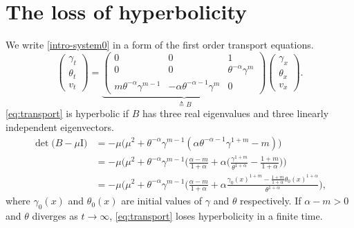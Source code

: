 \documentclass[a4paper,11pt]{article}
\theoremstyle{remark}
\begin{document}
\section{The loss of hyperbolicity} \label{append:hadamard}
We write \eqref{intro-system0} in a form of the first order transport equations.
\begin{equation} \label{eq:transport}
 \begin{pmatrix} \gamma_t \\ \theta_t \\ v_t \end{pmatrix} = \underbrace{
 \begin{pmatrix}
  0 & 0 & 1\\
  0 & 0 & \theta^{-\alpha}\gamma^m \\
  m\theta^{-\alpha}\gamma^{m-1} & -\alpha\theta^{-\alpha-1}\gamma^m & 0 \end{pmatrix}}_\text{$\triangleq B$}
  \begin{pmatrix} \gamma_x \\ \theta_x \\ v_x \end{pmatrix}.
\end{equation}
\eqref{eq:transport} is hyperbolic if $B$ has three real eigenvalues and three linearly independent eigenvectors.
\begin{align*}
 \det\big(B-\mu\textrm{I}\big) &= -\mu\big(\mu^2+\theta^{-\alpha}\gamma^{m-1}(\alpha \theta^{-\alpha-1}\gamma^{1+m} - m)\big)\\
 &=-\mu\big(\mu^2+\theta^{-\alpha}\gamma^{m-1}\Big(\frac{\alpha-m}{1+\alpha}+\alpha \Big(\frac{\gamma^{1+m}}{\theta^{1+\alpha}} - \frac{1+m}{1+\alpha}\Big)\Big)\\
 &=-\mu\big(\mu^2+\theta^{-\alpha}\gamma^{m-1}\Big(\frac{\alpha-m}{1+\alpha}+\alpha \frac{\gamma_0(x)^{1+m} - \frac{1+m}{1+\alpha}\theta_0(x)^{1+\alpha}}{\theta^{1+\alpha}}\Big),
\end{align*}
where $\gamma_0(x)$ and $\theta_0(x)$ are initial values of $\gamma$ and $\theta$ respectively. If $\alpha-m>0$ and $\theta$ diverges as $t \rightarrow \infty$, \eqref{eq:transport} loses hyperbolicity in a finite time.
%
\end{document}
